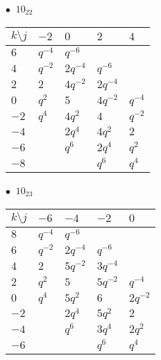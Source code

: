 %
\begin{minipage}{\linewidth}
$\bullet\ $ $10_{22}$ \vspace{0.5em} \\
\begin{tabular}{l|llll}
$k \setminus j$ & $-2$ & $0$ & $2$ & $4$ \\
\hline
$6$ & $q^{-4}$ & $q^{-6}$ &  &  \\
$4$ & $q^{-2}$ & $2q^{-4}$ & $q^{-6}$ &  \\
$2$ & $2$ & $4q^{-2}$ & $2q^{-4}$ &  \\
$0$ & $q^{2}$ & $5$ & $4q^{-2}$ & $q^{-4}$ \\
$-2$ & $q^{4}$ & $4q^{2}$ & $4$ & $q^{-2}$ \\
$-4$ &  & $2q^{4}$ & $4q^{2}$ & $2$ \\
$-6$ &  & $q^{6}$ & $2q^{4}$ & $q^{2}$ \\
$-8$ &  &  & $q^{6}$ & $q^{4}$ \\
\end{tabular}
\vspace{2em}
\end{minipage}
%
\begin{minipage}{\linewidth}
$\bullet\ $ $10_{23}$ \vspace{0.5em} \\
\begin{tabular}{l|llll}
$k \setminus j$ & $-6$ & $-4$ & $-2$ & $0$ \\
\hline
$8$ & $q^{-4}$ & $q^{-6}$ &  &  \\
$6$ & $q^{-2}$ & $2q^{-4}$ & $q^{-6}$ &  \\
$4$ & $2$ & $5q^{-2}$ & $3q^{-4}$ &  \\
$2$ & $q^{2}$ & $5$ & $5q^{-2}$ & $q^{-4}$ \\
$0$ & $q^{4}$ & $5q^{2}$ & $6$ & $2q^{-2}$ \\
$-2$ &  & $2q^{4}$ & $5q^{2}$ & $2$ \\
$-4$ &  & $q^{6}$ & $3q^{4}$ & $2q^{2}$ \\
$-6$ &  &  & $q^{6}$ & $q^{4}$ \\
\end{tabular}
\vspace{2em}
\end{minipage}
%
